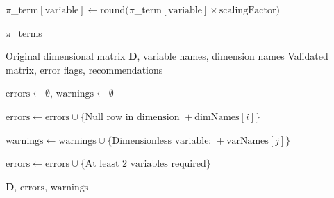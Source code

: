 \documentclass[
	11pt, %
	fleqn, %
	a4paper, %
]{LegrandOrangeBook}
\begin{document}
\begin{algorithm}[H]
\begin{algorithmic}[1]
                \State $\pi$\_term$[\text{variable}] \gets \text{round}(\pi$\_term$[\text{variable}] \times \text{scalingFactor})$
            \EndFor
        \EndIf
    \EndFor

    \State \Return $\pi$\_terms
\EndFunction
\end{algorithmic}
\end{algorithm}

\begin{algorithm}[H]
\caption{Matrix Preprocessing and Validation}
\begin{algorithmic}[1]
\Require Original dimensional matrix $\mathbf{D}$, variable names, dimension names
\Ensure Validated matrix, error flags, recommendations

    \State $\text{errors} \gets \emptyset$, $\text{warnings} \gets \emptyset$

    \State {}
            \State $\text{errors} \gets \text{errors} \cup \{\text{Null row in dimension } + \text{dimNames}[i]\}$ 
        \EndIf
    \EndFor

    \State {}
            \State $\text{warnings} \gets \text{warnings} \cup \{\text{Dimensionless variable: } + \text{varNames}[j]\}$ 
        \EndIf
    \EndFor

    \State {}
        \State $\text{errors} \gets \text{errors} \cup \{\text{At least 2 variables required}\}$ 
    \EndIf

    \State \Return $\mathbf{D}$, $\text{errors}$, $\text{warnings}$
\EndFunction
\end{algorithmic}
\end{algorithm}
\end{document}

